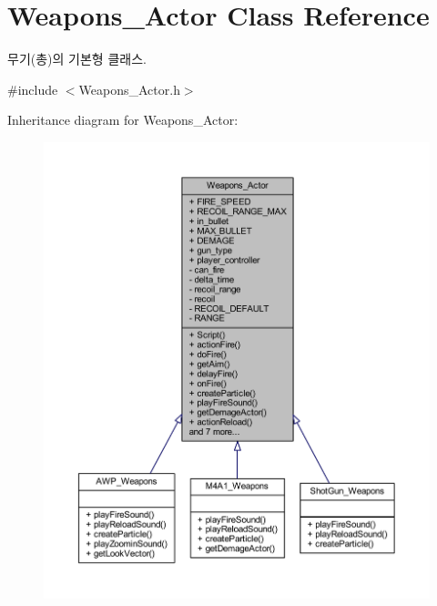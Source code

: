 \hypertarget{class_weapons___actor}{}\section{Weapons\+\_\+\+Actor Class Reference}
\label{class_weapons___actor}


무기(총)의 기본형 클래스.  




{\ttfamily \#include $<$Weapons\+\_\+\+Actor.\+h$>$}



Inheritance diagram for Weapons\+\_\+\+Actor\+:\nopagebreak
\begin{figure}[H]
\begin{center}
\leavevmode
\includegraphics[width=350pt]{class_weapons___actor__inherit__graph}
\end{center}
\end{figure}


